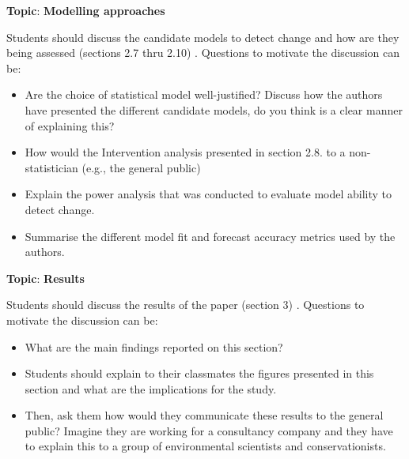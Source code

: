 \documentclass[
  letterpaper,
  DIV=11,
  numbers=noendperiod]{scrartcl}
\providecommand{\tightlist}{%
  \setlength{\itemsep}{0pt}\setlength{\parskip}{0pt}}\usepackage{longtable,booktabs,array}
\begin{document}
\begin{tcolorbox}[enhanced jigsaw, colbacktitle=quarto-callout-tip-color!10!white, colframe=quarto-callout-tip-color-frame, left=2mm, rightrule=.15mm, breakable, bottomrule=.15mm, toptitle=1mm, arc=.35mm, toprule=.15mm, coltitle=black, colback=white, opacityback=0, bottomtitle=1mm, titlerule=0mm, title={Example: Group 3}, opacitybacktitle=0.6, leftrule=.75mm]

\textbf{Topic}: \textbf{Modelling approaches}

Students should discuss the candidate models to detect change and how
are they being assessed (sections 2.7 thru 2.10) . Questions to motivate
the discussion can be:

\begin{itemize}
\tightlist
\item
  Are the choice of statistical model well-justified? Discuss how the
  authors have presented the different candidate models, do you think is
  a clear manner of explaining this?
\item
  How would the Intervention analysis presented in section 2.8. to a
  non-statistician (e.g., the general public)
\item
  Explain the power analysis that was conducted to evaluate model
  ability to detect change.
\item
  Summarise the different model fit and forecast accuracy metrics used
  by the authors.
\end{itemize}

\end{tcolorbox}

\begin{tcolorbox}[enhanced jigsaw, colbacktitle=quarto-callout-tip-color!10!white, colframe=quarto-callout-tip-color-frame, left=2mm, rightrule=.15mm, breakable, bottomrule=.15mm, toptitle=1mm, arc=.35mm, toprule=.15mm, coltitle=black, colback=white, opacityback=0, bottomtitle=1mm, titlerule=0mm, title={Example: Group 4}, opacitybacktitle=0.6, leftrule=.75mm]

\textbf{Topic}: \textbf{Results}

Students should discuss the results of the paper (section 3) . Questions
to motivate the discussion can be:

\begin{itemize}
\tightlist
\item
  What are the main findings reported on this section?
\item
  Students should explain to their classmates the figures presented in
  this section and what are the implications for the study.
\item
  Then, ask them how would they communicate these results to the general
  public? Imagine they are working for a consultancy company and they
  have to explain this to a group of environmental scientists and
  conservationists.
\end{itemize}

\end{tcolorbox}
\end{document}
